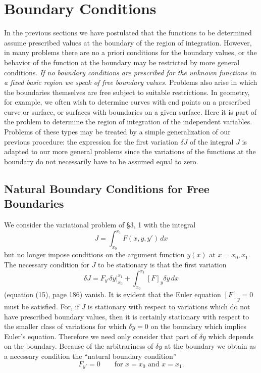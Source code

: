 \section{Boundary Conditions}
In the previous sections we have postulated that the functions to be determined assume prescribed values at the boundary of the region of integration. However, in many problems there are no a priori conditions for the boundary values, or the behavior of the function at the boundary may be restricted by more general conditions. \emph{If no boundary conditions are prescribed for the unknown functions in a fixed basic region we speak of free boundary values.} Problems also arise in which the boundaries themselves are free subject to suitable restrictions. In geometry, for example, we often wish to determine curves with end points on a prescribed curve or surface, or surfaces with boundaries on a given surface. Here it is part of the problem to determine the region of integration of the independent variables. Problems of these types may be treated by a simple generalization of our previous procedure: the expression for the first variation $\delta J$ of the integral $J$ is adapted to our more general problems since the variations of the functions at the boundary do not necessarily have to be assumed equal to zero.

\subsection{Natural Boundary Conditions for Free Boundaries}
We consider the variational problem of \S3, 1 with the integral
\[
J=\int_{x_0}^{x_1}F(x,y,y')\,dx
\]
but no longer impose conditions on the argument function $y(x)$ at $x=x_0,x_1$. The necessary condition for $J$ to be stationary is that the first variation
\[
\delta J=F_{y'}\delta y\big|_{x_0}^{x_1}+\int_{x_0}^{x_1}[F]_y\delta y\,dx
\]
(equation (15), page 186) vanish. It is evident that the Euler equation $[F]_y=0$ must be satisfied. For, if $J$ is stationary with respect to variations which do not have prescribed boundary values, then it is certainly stationary with respect to the smaller class of variations for which $\delta y=0$ on the boundary which implies Euler's equation. Therefore we need only consider that part of $\delta y$ which depends on the boundary. Because of the arbitrariness of $\delta y$ at the boundary we obtain as a necessary condition the ``natural boundary condition''
\[
F_{y'}=0\qquad\text{for }x=x_0\text{ and }x=x_1.
\]

